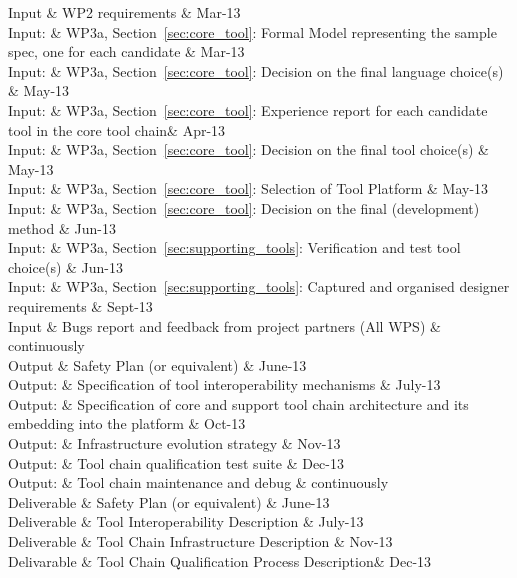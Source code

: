 \documentclass{template/openetcs_article}
\begin{document}
\begin{inoutput}
Input & WP2 requirements & Mar-13\\
Input: & WP3a, Section~\ref{sec:core_tool}: Formal Model representing the sample
spec, one for each candidate  & Mar-13 \\
Input: & WP3a, Section~\ref{sec:core_tool}: Decision on the final language
choice(s) & May-13 \\
Input: & WP3a, Section~\ref{sec:core_tool}: Experience report for each candidate
tool in the core tool chain& Apr-13 \\
Input: & WP3a, Section~\ref{sec:core_tool}: Decision on the final tool choice(s)
& May-13 \\
Input: & WP3a, Section~\ref{sec:core_tool}: Selection of Tool Platform  & May-13 \\
Input: & WP3a, Section~\ref{sec:core_tool}: Decision on the final (development)
method  & Jun-13 \\
Input: & WP3a, Section~\ref{sec:supporting_tools}: Verification and test tool
choice(s)  & Jun-13 \\
Input: & WP3a, Section~\ref{sec:supporting_tools}: Captured and organised designer
requirements  & Sept-13 \\
Input & Bugs report and feedback from project partners (All WPS) 
& continuously\\
\hline
Output  & Safety Plan (or equivalent) & June-13\\
Output: & Specification of tool interoperability mechanisms & July-13 \\
Output: & Specification of core and support tool chain architecture and its
embedding into the platform & Oct-13 \\
Output: & Infrastructure evolution strategy & Nov-13 \\
Output: & Tool chain qualification test suite & Dec-13 \\
Output: & Tool chain maintenance and debug & continuously \\
\hline
Deliverable & Safety Plan (or equivalent) & June-13\\
Deliverable & Tool  Interoperability  Description & July-13\\
Deliverable & Tool Chain Infrastructure Description & Nov-13\\
Delivarable & Tool Chain Qualification Process Description& Dec-13\\
\end{inoutput}
\end{document}

